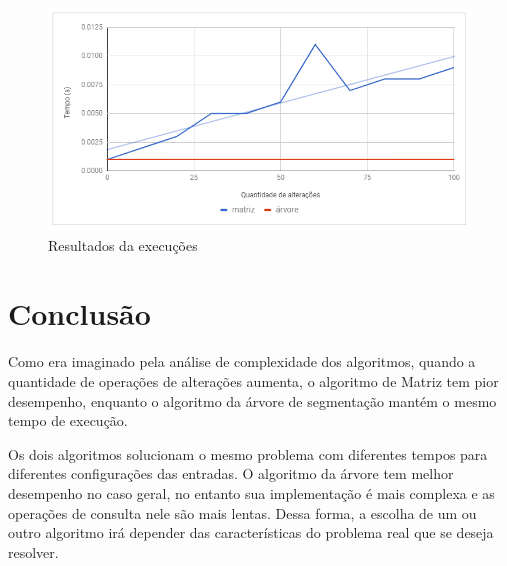 \documentclass[10pt,a4paper]{article}
\begin{document}
	\begin{figure}[H]
		\centering
		\caption{Resultados da execuções}
		\label{fig01}
		\includegraphics[scale=0.65]{tempos}
	\end{figure}

	\section{Conclusão}

	Como era imaginado pela análise de complexidade dos algoritmos, quando a quantidade de operações de alterações aumenta, o algoritmo de Matriz tem pior desempenho, enquanto o algoritmo da árvore de segmentação mantém o mesmo tempo de execução.

	Os dois algoritmos solucionam o mesmo problema com diferentes tempos para diferentes configurações das entradas. O algoritmo da árvore tem melhor desempenho no caso geral, no entanto sua implementação é mais complexa e as operações de consulta nele são mais lentas. Dessa forma, a escolha de um ou outro algoritmo irá depender das características do problema real que se deseja resolver.
\end{document}
